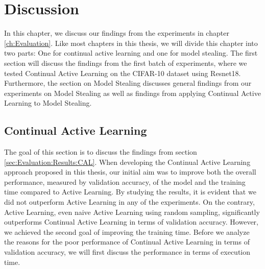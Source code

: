 
\chapter{Discussion}
\label{ch:Discussion}
In this chapter, we discuss our findings from the experiments in chapter \ref{ch:Evaluation}. Like most chapters in this thesis, we will divide
this chapter into two parts: One for continual active learning and one for model stealing. The first section will discuss the findings from the first
batch of experiments, where we tested Continual Active Learning on the CIFAR-10 dataset using Resnet18. Furthermore, the section on Model Stealing
discusses general findings from our experiments on Model Stealing as well as findings from applying Continual Active Learning to Model Stealing. 

\section{Continual Active Learning}
\label{sec:Discussion:ContinualActiveLearning}
The goal of this section is to discuss the findings from section \ref{sec:Evaluation:Results:CAL}. When developing the Continual Active Learning
approach proposed in this thesis, our initial aim was to improve both the overall performance, measured by validation accuracy, of the model and the
training time compared to Active Learning. By studying the results, it is evident that we did not outperform Active Learning in any of the
experiments. On the contrary, Active Learning, even naive Active Learning using random sampling, significantly outperforms Continual Active Learning
in terms of validation accuracy. However, we achieved the second goal of improving the training time. Before we analyze the reasons for the
poor performance of Continual Active Learning in terms of validation accuracy, we will first discuss the performance in terms of execution time.

